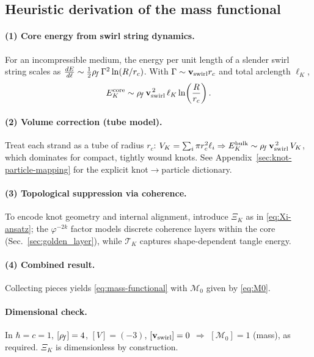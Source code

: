 \subsection{Heuristic derivation of the mass functional}

\paragraph{(1) Core energy from swirl string dynamics.}
For an incompressible medium, the energy per unit length of a slender swirl string scales as
\(
\tfrac{dE}{d\ell} \sim \tfrac{1}{2}\rho_{\!f}\,\Gamma^2 \ln (R/r_c)
\).
With \(\Gamma \sim \mathbf{v}_{\mathrm{swirl}} r_c\) and total arclength \(\ell_K\),
\begin{equation}
    E_K^{\mathrm{core}} \sim \rho_{\!f}\,\mathbf{v}_{\mathrm{swirl}}^{\,2}\,\ell_K \ln\!\left(\frac{R}{r_c}\right).
\end{equation}

\paragraph{(2) Volume correction (tube model).}
Treat each strand as a tube of radius \(r_c\):
\(
V_K=\sum_i \pi r_c^2 \ell_i
\Rightarrow
E_K^{\mathrm{bulk}} \sim \rho_{\!f}\,\mathbf{v}_{\mathrm{swirl}}^{\,2}\,V_K
\),
which dominates for compact, tightly wound knots.
See Appendix~\ref{sec:knot-particle-mapping} for the explicit knot$\to$particle dictionary.

\paragraph{(3) Topological suppression via coherence.}
To encode knot geometry and internal alignment, introduce \(\Xi_K\) as in \eqref{eq:Xi-ansatz}; the \(\varphi^{-2k}\) factor models discrete coherence layers within the core (Sec.~\ref{sec:golden_layer}), while \(\mathcal{T}_K\) captures shape-dependent tangle energy.

\paragraph{(4) Combined result.}
Collecting pieces yields \eqref{eq:mass-functional} with \(\mathcal{M}_0\) given by \eqref{eq:M0}.

\paragraph{Dimensional check.}
In \(\hbar=c=1\), \([\rho_{\!f}]=4\), \([V]=(-3)\), \([\mathbf{v}_{\mathrm{swirl}}]=0\) \(\Rightarrow\) \([\mathcal{M}_0]=1\) (mass), as required. \(\Xi_K\) is dimensionless by construction.

